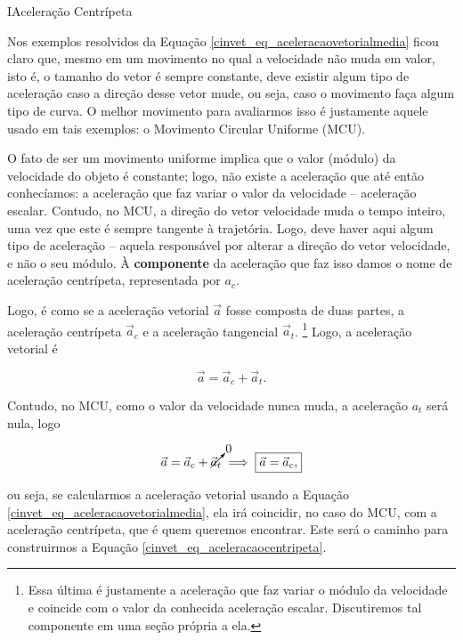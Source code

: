 \vspace{0.3cm}




\begin{secnivel}{I}{Aceleração Centrípeta}
  

\end{secnivel}









Nos exemplos resolvidos da Equação \eqref{cinvet_eq_aceleracaovetorialmedia} ficou claro que, mesmo em um movimento no qual a velocidade não muda em valor, isto é, o tamanho do vetor é sempre constante, deve existir algum tipo de aceleração caso a direção desse vetor mude, ou seja, caso o movimento faça algum tipo de curva. O melhor movimento para avaliarmos isso é justamente aquele usado em tais exemplos: o Movimento Circular Uniforme (MCU).

O fato de ser um movimento uniforme implica que o valor (módulo) da velocidade do objeto é constante; logo, não existe a aceleração que até então conhecíamos: a aceleração que faz variar o valor da velocidade -- aceleração escalar. Contudo, no MCU, a direção do vetor velocidade muda o tempo inteiro, uma vez que este é sempre tangente à trajetória. Logo, deve haver aqui algum tipo de aceleração -- aquela responsável por alterar a direção do vetor velocidade, e não o seu módulo. À \textbf{componente} da aceleração que faz isso damos o nome de aceleração centrípeta, representada por $a_c.$

Logo, é como se a aceleração vetorial $\vec{a}$ fosse composta de duas partes, a aceleração centrípeta $\vec{a}_c$ e a aceleração tangencial $\vec{a}_t$. \footnote{Essa última é justamente a aceleração que faz variar o módulo da velocidade e coincide com o valor da conhecida aceleração escalar. Discutiremos tal componente em uma seção própria a ela.} Logo, a aceleração vetorial é

$$\boxed{ \vec{a} = \vec{a}_c + \vec{a}_t.}$$

Contudo, no MCU, como o valor da velocidade nunca muda, a aceleração $a_t$ será nula, logo

$$ \vec{a} = \vec{a}_c + \cancelto{0}{\vec{a}_t} \implies  \boxed{ \vec{a} = \vec{a}_c,}$$

\noindent ou seja, se calcularmos a aceleração vetorial usando a Equação \eqref{cinvet_eq_aceleracaovetorialmedia}, ela irá coincidir, no caso do MCU, com a aceleração centrípeta, que é quem queremos encontrar. Este será o caminho para construirmos a Equação \eqref{cinvet_eq_aceleracaocentripeta}. 

